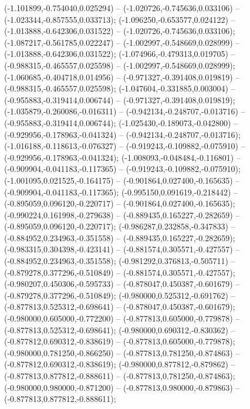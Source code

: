 (-1.101899,-0.754040,0.025294) -- (-1.020726,-0.745636,0.033106) -- (-1.023344,-0.857555,0.033713);
 (-1.096250,-0.653577,0.024122) -- (-1.013888,-0.642306,0.031522) -- (-1.020726,-0.745636,0.033106);
 (-1.087217,-0.561785,0.022247) -- (-1.002997,-0.548669,0.028999) -- (-1.013888,-0.642306,0.031522);
 (-1.074966,-0.479313,0.019705) -- (-0.988315,-0.465557,0.025598) -- (-1.002997,-0.548669,0.028999);
 (-1.060685,-0.404718,0.014956) -- (-0.971327,-0.391408,0.019819) -- (-0.988315,-0.465557,0.025598);
 (-1.047604,-0.331885,0.003004) -- (-0.955883,-0.319414,0.006744) -- (-0.971327,-0.391408,0.019819);
 (-1.035879,-0.260086,-0.016311) -- (-0.942134,-0.248707,-0.013716) -- (-0.955883,-0.319414,0.006744);
 (-1.025430,-0.189073,-0.042800) -- (-0.929956,-0.178963,-0.041324) -- (-0.942134,-0.248707,-0.013716);
 (-1.016188,-0.118613,-0.076327) -- (-0.919243,-0.109882,-0.075910) -- (-0.929956,-0.178963,-0.041324);
 (-1.008093,-0.048484,-0.116801) -- (-0.909904,-0.041183,-0.117365) -- (-0.919243,-0.109882,-0.075910);
 (-1.001095,0.021525,-0.164175) -- (-0.901864,0.027400,-0.165635) -- (-0.909904,-0.041183,-0.117365);
 (-0.995150,0.091619,-0.218442) -- (-0.895059,0.096120,-0.220717) -- (-0.901864,0.027400,-0.165635);
 (-0.990224,0.161998,-0.279638) -- (-0.889435,0.165227,-0.282659) -- (-0.895059,0.096120,-0.220717);
 (-0.986287,0.232858,-0.347833) -- (-0.884952,0.234963,-0.351558) -- (-0.889435,0.165227,-0.282659);
 (-0.983315,0.304398,-0.423141) -- (-0.881574,0.305571,-0.427557) -- (-0.884952,0.234963,-0.351558);
 (-0.981292,0.376813,-0.505711) -- (-0.879278,0.377296,-0.510849) -- (-0.881574,0.305571,-0.427557);
 (-0.980207,0.450306,-0.595733) -- (-0.878047,0.450387,-0.601679) -- (-0.879278,0.377296,-0.510849);
 (-0.980000,0.525312,-0.691762) -- (-0.877813,0.525312,-0.698641) -- (-0.878047,0.450387,-0.601679);
 (-0.980000,0.605000,-0.772200) -- (-0.877813,0.605000,-0.779878) -- (-0.877813,0.525312,-0.698641);
 (-0.980000,0.690312,-0.830362) -- (-0.877812,0.690312,-0.838619) -- (-0.877813,0.605000,-0.779878);
 (-0.980000,0.781250,-0.866250) -- (-0.877813,0.781250,-0.874863) -- (-0.877812,0.690312,-0.838619);
 (-0.980000,0.877812,-0.879862) -- (-0.877813,0.877812,-0.888611) -- (-0.877813,0.781250,-0.874863);
 (-0.980000,0.980000,-0.871200) -- (-0.877813,0.980000,-0.879863) -- (-0.877813,0.877812,-0.888611);
